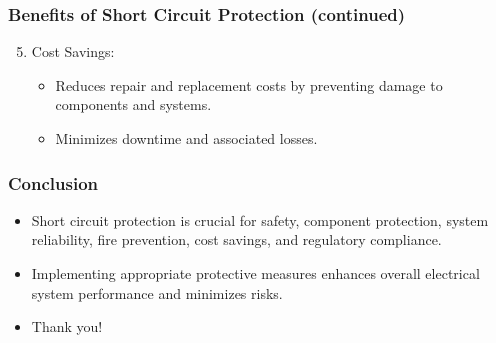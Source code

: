 \documentclass{beamer}
\begin{document}
\begin{frame}
\frametitle{Benefits of Short Circuit Protection (continued)}
\begin{enumerate}
\setcounter{enumi}{4}
\item Cost Savings:
\begin{itemize}
\item Reduces repair and replacement costs by preventing damage to components and systems.
\item Minimizes downtime and associated losses.
\end{itemize}
\end{enumerate}
\end{frame}

\begin{frame}
\frametitle{Conclusion}
\begin{itemize}
\item Short circuit protection is crucial for safety, component protection, system reliability, fire prevention, cost savings, and regulatory compliance.
\item Implementing appropriate protective measures enhances overall electrical system performance and minimizes risks.
\end{itemize}
\end{frame}

\begin{frame}

\begin{itemize}
\item Thank you! 
\end{itemize}
\end{frame}
\end{document}
